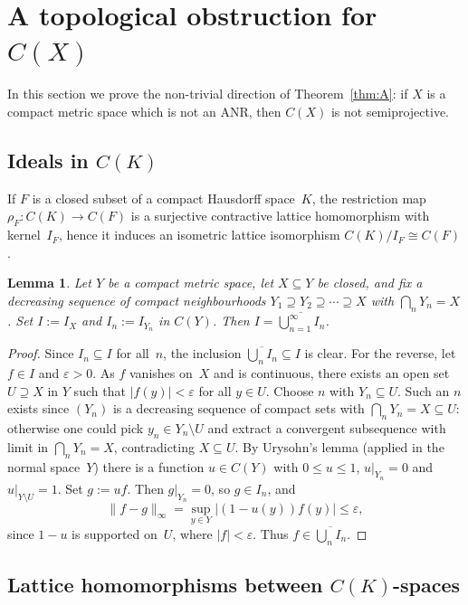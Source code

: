 \documentclass[11pt]{amsart}
\renewcommand{\le}{\leqslant}
\numberwithin{equation}{section}
\newtheorem{lemma}[theorem]{Lemma}
\theoremstyle{definition}
\theoremstyle{remark}
\theoremstyle{plain}
\begin{document}
\section{A topological obstruction for $C(X)$}\label{sec:CX}

In this section we prove the non-trivial direction of Theorem~\ref{thm:A}:
if $X$ is a compact metric space which is not an ANR,
then $C(X)$ is not semiprojective.

\subsection{Ideals in $C(K)$}

If $F$ is a closed subset of a compact Hausdorff space~$K$,
the restriction map $\rho_F\colon C(K)\to C(F)$ is a surjective
contractive lattice homomorphism with kernel~$I_F$,
hence it induces an isometric lattice isomorphism $C(K)/I_F\cong C(F)$.

\begin{lemma}\label{lem:limit-ideal}
Let $Y$ be a compact metric space, let $X\subseteq Y$ be closed,
and fix a decreasing sequence of compact neighbourhoods
$Y_1\supseteq Y_2\supseteq\cdots\supseteq X$
with $\bigcap_{n} Y_n=X$.
Set $I:=I_X$ and $I_n:=I_{Y_n}$ in $C(Y)$.
Then $I=\overline{\bigcup_{n=1}^\infty I_n}$.
\end{lemma}

\begin{proof}
Since $I_n\subseteq I$ for all~$n$, the inclusion
$\overline{\bigcup_n I_n}\subseteq I$ is clear.
For the reverse, let $f\in I$ and $\varepsilon>0$.
As $f$ vanishes on~$X$ and is continuous,
there exists an open set $U\supseteq X$ in $Y$ such that $|f(y)|<\varepsilon$ for all $y\in U$.
Choose $n$ with $Y_n\subseteq U$.
Such an $n$ exists since $(Y_n)$ is a decreasing sequence of compact sets with
$\bigcap_n Y_n=X\subseteq U$:
otherwise one could pick $y_n\in Y_n\setminus U$ and extract a convergent subsequence
with limit in $\bigcap_n Y_n=X$, contradicting $X\subseteq U$.
By Urysohn's lemma (applied in the normal space~$Y$) there is a
function $u\in C(Y)$ with $0\le u\le 1$, $u|_{Y_n}=0$ and $u|_{Y\setminus U}=1$.
Set $g:=uf$.
Then $g|_{Y_n}=0$, so $g\in I_n$, and
\[
\|f-g\|_\infty=\sup_{y\in Y}\bigl|(1-u(y))f(y)\bigr|\le \varepsilon,
\]
since $1-u$ is supported on~$U$, where $|f|<\varepsilon$.
Thus $f\in\overline{\bigcup_n I_n}$.
\end{proof}

\subsection{Lattice homomorphisms between $C(K)$-spaces}
\end{document}
